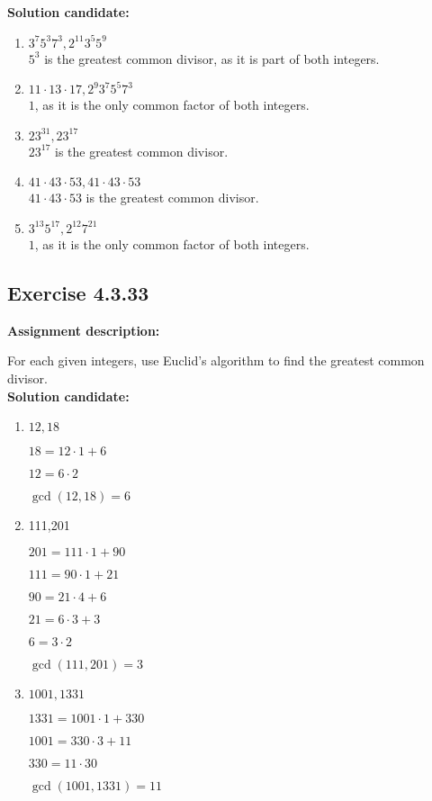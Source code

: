 \documentclass{report}
\newcommand{\cent}[1]{\begin{center}#1\end{center}}
\newcommand{\AssignmentDescription}{\textbf{Assignment description: }}
\newcommand{\Solution}{\textbf{Solution candidate: }}
\newcommand{\Exercise}[1]{\subsection{Exercise #1}}
\newcommand{\defaultEnumerateLabel}{\textbf{\alph*.}}
\newcommand{\MyItem}[1]{\item #1\\}
\begin{document}
\begin{enumerate}[label=\defaultEnumerateLabel]
	\Solution
	
	\begin{enumerate}[label=\defaultEnumerateLabel]
		\MyItem{$3^7 5^3 7^3, 2^{11} 3^5 5^9$}
		
		$5^3$ is the greatest common divisor, as it is part of both integers.\\
		
		\MyItem{$11 \cdot 13 \cdot 17, 2^9 3^7 5^5 7^3$}
		
		$1$, as it is the only common factor of both integers.\\
		
		\MyItem{$23^{31}, 23^{17}$}
		
		$23^{17}$ is the greatest common divisor.\\
		
		\MyItem{$41 \cdot 43 \cdot 53, 41 \cdot 43 \cdot 53$}
		
		$41 \cdot 43 \cdot 53$ is the greatest common divisor.\\
		
		\MyItem{$3^{13} 5^{17} , 2^{12} 7^{21}$}
		
		$1$, as it is the only common factor of both integers.\\
	\end{enumerate}
	
	\Exercise{4.3.33}
	
	\AssignmentDescription
	
	For each given integers, use Euclid's algorithm to find the greatest common divisor.\\
	
	\Solution
	
	\begin{enumerate}[label=\defaultEnumerateLabel]
		\MyItem{$12,18$}
		
		\cent{$18 = 12 \cdot 1 + 6$}
		\cent{$12 = 6 \cdot 2$}
		
		\cent{$\gcd(12,18) = 6$}
		
		\MyItem{111,201}
		
		\cent{$201 = 111\cdot 1 + 90$}
		\cent{$111 = 90 \cdot 1 + 21$}
		\cent{$90 = 21 \cdot 4 + 6$}
		\cent{$21 = 6 \cdot 3 + 3$}
		\cent{$6 = 3 \cdot 2$}
		
		\cent{$\gcd(111,201) = 3$}
		
		\MyItem{$1001,1331$}
		
		\cent{$1331 = 1001 \cdot 1 + 330$}
		\cent{$1001 = 330 \cdot 3 + 11$}
		\cent{$330 = 11 \cdot 30 $}
		
		\cent{$\gcd(1001,1331) = 11$}
		

\end{enumerate}
\end{enumerate}
\end{document}
